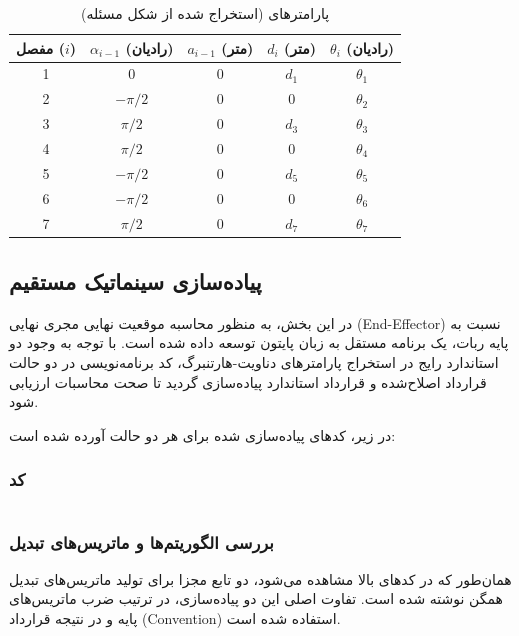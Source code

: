 \documentclass{article}
\begin{document}
\begin{table}[htbp]
	\centering
	\caption{پارامترهای  (استخراج شده از شکل مسئله)}
	\label{tab:modified_dh}
	\begin{tabular}{|c|c|c|c|c|}
		\hline
		مفصل ($i$) & $\alpha_{i-1}$ (رادیان) & $a_{i-1}$ (متر) & $d_i$ (متر) & $\theta_i$ (رادیان) \\ \hline
		1 & 0 & 0 & $d_1$ & $\theta_1$ \\ \hline
		2 & $-\pi/2$ & 0 & 0 & $\theta_2$ \\ \hline
		3 & $\pi/2$ & 0 & $d_3$ & $\theta_3$ \\ \hline
		4 & $\pi/2$ & 0 & 0 & $\theta_4$ \\ \hline
		5 & $-\pi/2$ & 0 & $d_5$ & $\theta_5$ \\ \hline
		6 & $-\pi/2$ & 0 & 0 & $\theta_6$ \\ \hline
		7 & $\pi/2$ & 0 & $d_7$ & $\theta_7$ \\ \hline
	\end{tabular}
\end{table}

\subsection{پیاده‌سازی سینماتیک مستقیم }
در این بخش، به منظور محاسبه موقعیت نهایی مجری نهایی (End-Effector) نسبت به پایه ربات، یک برنامه مستقل به زبان پایتون توسعه داده شده است. با توجه به وجود دو استاندارد رایج در استخراج پارامترهای دناویت-هارتنبرگ، کد برنامه‌نویسی در دو حالت قرارداد اصلاح‌شده  و قرارداد استاندارد  پیاده‌سازی گردید تا صحت محاسبات ارزیابی شود.

در زیر، کدهای پیاده‌سازی شده برای هر دو حالت آورده شده است:
\subsubsection{کد}
\begin{LTR}
	\inputminted{python}{code/RC-Hw2-Q1.py}
\end{LTR}

\subsubsection{بررسی الگوریتم‌ها و ماتریس‌های تبدیل}
همان‌طور که در کدهای بالا مشاهده می‌شود، دو تابع مجزا برای تولید ماتریس‌های تبدیل همگن  نوشته شده است. تفاوت اصلی این دو پیاده‌سازی، در ترتیب ضرب ماتریس‌های پایه و در نتیجه قرارداد (Convention) استفاده شده است.
\end{document}
